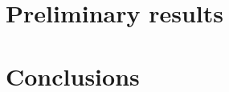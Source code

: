 \documentclass{vldb}
\begin{document}
\section{Preliminary results}


\section{Conclusions}






  
\end{document}
